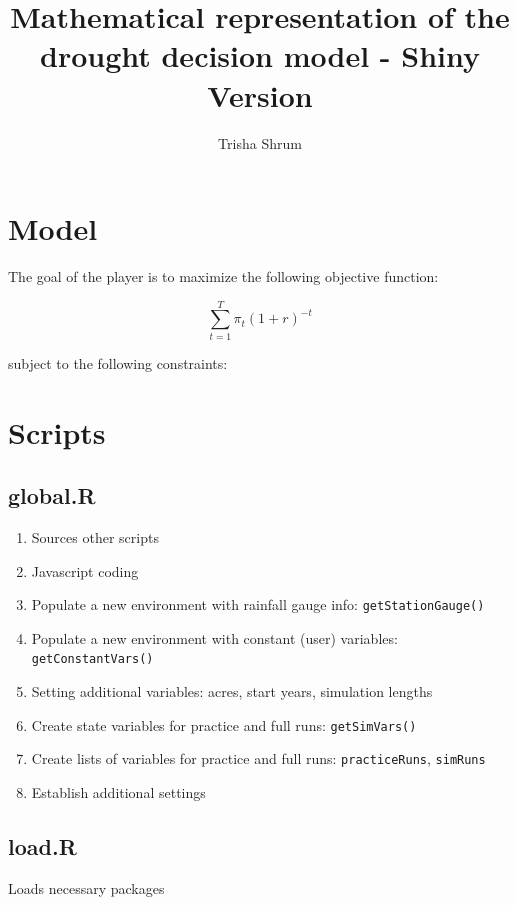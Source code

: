 \documentclass[11pt]{article}
\title{Mathematical representation of the drought decision model - Shiny Version}
\author{Trisha Shrum}
\begin{document}
\maketitle

\section{Model}

The goal of the player is to maximize the following objective function:

\begin{equation}
\sum_{t=1}^T \pi_t(1+r)^{-t}
\end{equation}

subject to the following constraints:

\section{Scripts}

\subsection{global.R}
\begin{enumerate}
\item Sources other scripts
\item Javascript coding
\item Populate a new environment with rainfall gauge info: \verb!getStationGauge()!
\item Populate a new environment with constant (user) variables: \verb!getConstantVars()!
\item Setting additional variables: acres, start years, simulation lengths
\item Create state variables for practice and full runs: \verb!getSimVars()!
\item Create lists of variables for practice and full runs: \verb!practiceRuns!, \verb!simRuns!
\item Establish additional settings
\end{enumerate}  
 
\subsection{load.R}
Loads necessary packages
\end{document}
